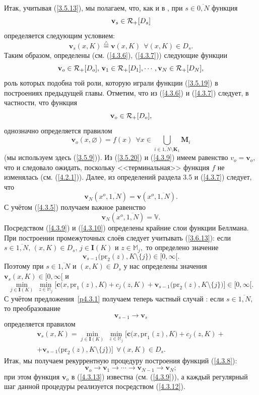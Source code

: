 \documentclass[11pt,twoside]{report}
\newcommand{\bfn}{\begin{equation}}
\newcommand{\efn}{\end{equation}}
\newcommand{\df}{\stackrel{\triangle}{=}}
\newcommand{\ov}{\overline}
\newcommand{\sm}{\setminus}
\newcommand{\fa}{\forall}
\newcommand{\car}{{\cal R}}
\newcommand{\bbm}{{\mathbb M}}
\newcommand{\emp}{\varnothing}
\begin{document}
{Итак, учитывая (\ref{3.5.13}), мы полагаем, что, как и в \cite[(6.12)]{Cha3`}, при
$s\in \ov{0,N}$ функция
\bfn\label{4.3.6`}\mathbf{v}_s\in \car_+ [D_s]
\efn
определяется следующим условием:
\bfn\label{4.3.7}\mathbf{v}_s(x,K) \df \mathbf{v}(x,K)\ \ \fa (x,K)\in D_s.
\efn
Таким образом, определены (см. (\ref{4.3.6}), (\ref{4.3.7})) следующие функции
$$
\mathbf{v}_o\in \car_+[D_o],\,\mathbf{v}_1\in \car_+[D_1],\cdots,
\mathbf{v}_N\in \car_+[D_N],
$$
роль которых подобна той роли, которую играли функции (\ref{3.5.19}) в
построениях предыдущей главы. Отметим, что из (\ref{4.3.6}) и (\ref{4.3.7})
следует, в частности, что функция
\bfn\label{4.3.8}
\mathbf{v}_o\in \car_+[D_o],
\efn
однозначно определяется правилом
\bfn\label{4.3.9}\mathbf{v}_o(x,\emp) = f(x)\ \ \fa x\in
\bigcup\limits_{i\in\ov{1,N}\sm \mathbf{K}_1}\mathbf{M}_i
\efn
(мы используем здесь (\ref{3.5.9})). Из (\ref{3.5.20}) и (\ref{4.3.9})
имеем равенство $v_o = \mathbf{v}_o,$ что и следовало ожидать, поскольку
<<терминальная>> функция $f$ не изменялась
(см. (\ref{4.2.1})). Далее, из определений раздела 3.5 и (\ref{4.3.7})
следует, что
$$
\mathbf{v}_N(x^o,\ov{1,N}) = \mathbf{v}(x^o,\ov{1,N}).
$$
С учётом (\ref{4.3.5}) получаем важное равенство
\bfn\label{4.3.10}\mathbf{v}_N(x^o,\ov{1,N})= \mathbb{V}.
\efn
Посредством (\ref{4.3.9}) и (\ref{4.3.10}) определены крайние слои
функции Беллмана. При построении
промежуточных слоёв следует учитывать (\ref{3.6.13}):  если $s\in\ov{1,N},\,
(x,K)\in D_s,\,j\in \mathbf{I}(K)$ и $z\in \bbm_j,$ то определено значение
$$
\mathbf{v}_{s-1}\bigl(\mathrm{pr}_2(z),K\sm\{j\}\bigl)\in [0,\infty[.
$$
Поэтому при $s\in\ov{1,N}$ и $(x,K)\in D_s$ у нас определены значения
$\mathbf{v}_s(x,K)\in [0,\infty[$ и
$$
\min\limits_{j\in \mathbf{I}(K)}\ \min\limits_{z\in\bbm_j}
\bigl[\mathbf{c}\bigl(x,\mathrm{pr}_1(z),K\bigl) +
c_j(z,K) + \mathbf{v}_{s-1}\bigl(\mathrm{pr}_2(z),K\sm\{j\}\bigl)
\bigl]\in [0,\infty[.
$$
С учётом предложения~\ref{p4.3.1}  получаем теперь частный
случай \cite[предложение~6.1]{Cha3`}:
если $s\in\ov{1,N},$ то преобразование
\bfn\label{4.3.11}
\mathbf{v}_{s-1}\longrightarrow \mathbf{v}_s
\efn
определяется правилом
\begin{eqnarray}
&\mathbf{v}_s(x,K) =  \min\limits_{j\in \mathbf{I}(K)}\
\min\limits_{z\in\bbm_j}\bigl[\mathbf{c}\bigl(x,\mathrm{pr}_1(z),K\bigl) +
 c_j(z,K) +
&\nonumber\\
&+\mathbf{v}_{s-1}\bigl(\mathrm{pr}_2(z),K\sm\{j\}\bigl)\bigl]\ \
\fa (x,K)\in  D_s.
\label{4.3.12}
\end{eqnarray}
Итак, мы получаем рекуррентную процедуру построения функций (\ref{4.3.8}):
\bfn\label{4.3.13}
\mathbf{v}_o\longrightarrow  \mathbf{v}_1\longrightarrow\cdots
\longrightarrow \mathbf{v}_{N-1}\longrightarrow \mathbf{v}_N;
\efn
при этом функция $\mathbf{v}_o$ в (\ref{4.3.13}) известна
(см. (\ref{4.3.9})), а каждый регулярный
шаг данной процедуры реализуется посредством  (\ref{4.3.12}).

}
\end{document}
